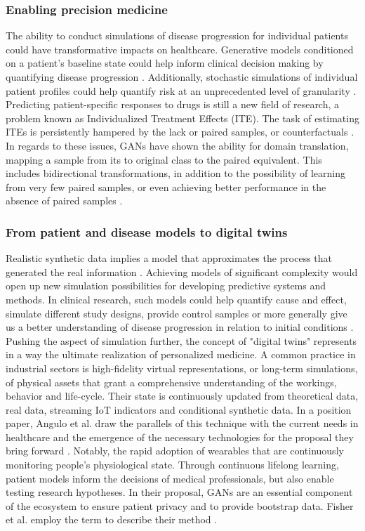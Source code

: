     \subsubsection{Enabling precision medicine}\label{sec:precision_med}
    The ability to conduct simulations of disease progression for individual patients could have transformative impacts on healthcare. Generative models conditioned on a patient's baseline state could help inform clinical decision making by quantifying disease progression \cite{walsh2020generating, Fisher2019}. Additionally, stochastic simulations of individual patient profiles could help quantify risk at an unprecedented level of granularity \cite{Fisher2019}. Predicting patient-specific responses to drugs is still a new field of research, a problem known as Individualized Treatment Effects (ITE). The task of estimating ITEs is persistently hampered by the lack or paired samples, or counterfactuals \cite{Yoon2018-mo, chu2019treatment}. In regards to these issues, GANs have shown the ability for domain translation, mapping a sample from its to original class to the paired equivalent. This includes bidirectional transformations, in addition to the possibility of learning from very few paired samples, or even achieving better performance in the absence of paired samples \cite{Wolterink2017DeepMT}.
    
    \subsubsection{From patient and disease models to digital twins}\label{sec:models_twins}
    Realistic synthetic data implies a model that approximates the process that generated the real information \cite{esteban2017real}. Achieving models of significant complexity would open up new simulation possibilities for developing predictive systems and methods. In clinical research, such models could help quantify cause and effect, simulate different study designs, provide control samples or more generally give us a better understanding of disease progression in relation to initial conditions \cite{Fisher2019, yahi2017generative, walsh2020generating}. Pushing the aspect of simulation further, the concept of "digital twins" represents in a way the ultimate realization of personalized medicine. A common practice in industrial sectors is high-fidelity virtual representations, or long-term simulations, of physical assets that grant a comprehensive understanding of the workings, behavior and life-cycle. Their state is continuously updated from theoretical data, real data, streaming IoT indicators and conditional synthetic data. In a position paper, Angulo et al. draw the parallels of this technique with the current needs in healthcare and the emergence of the necessary technologies for the proposal they bring forward \cite{angulo2019towards,Angulo_2020}. Notably, the rapid adoption of wearables that are continuously monitoring people's physiological state. Through continuous lifelong learning, patient models inform the decisions of medical professionals, but also enable testing research hypotheses. In their proposal, GANs are an essential component of the ecosystem to ensure patient privacy and to provide bootstrap data. Fisher et al. employ the term to describe their method \cite{walsh2020generating}.